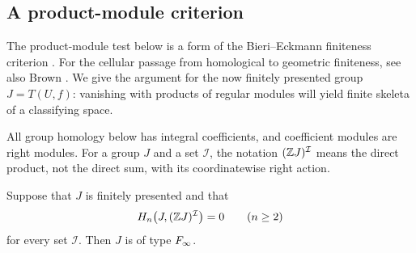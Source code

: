 \subsection{A product-module criterion}

The product-module test below is a form of the Bieri--Eckmann
finiteness criterion \citep[Proposition~1.2]{BieriEckmann1974}.
For the cellular passage from homological to geometric finiteness,
see also Brown \citep[Section~3]{Brown1975}.  We give the argument for
the now finitely presented group $J=T(U,f)$: vanishing with products
of regular modules will yield finite skeleta of a classifying space.

All group homology below has integral coefficients, and coefficient
modules are right modules.  For a group $J$ and a set $\mathcal I$, the
notation $(\mathbb Z J)^{\mathcal I}$ means the direct product, not the
direct sum, with its coordinatewise right action.

\begin{lemma}\label{lem:product-criterion}
Suppose that $J$ is finitely presented and that
\[
 H_n\bigl(J,(\mathbb Z J)^{\mathcal I}\bigr)=0
 \qquad(n\ge2)
\]
for every set $\mathcal I$.  Then $J$ is of type $F_\infty$.
\end{lemma}

